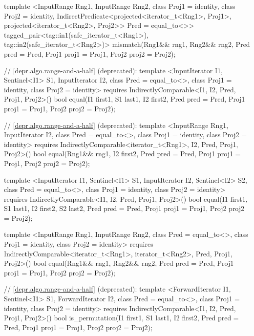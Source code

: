 \begin{codeblock}
{{{{  template <InputRange Rng1, InputRange Rng2,
      class Proj1 = identity, class Proj2 = identity,
      IndirectPredicate<projected<iterator_t<Rng1>, Proj1>,
        projected<iterator_t<Rng2>, Proj2>> Pred = equal_to<>>
    tagged_pair<tag::in1(safe_iterator_t<Rng1>),
                tag::in2(safe_iterator_t<Rng2>)>
      mismatch(Rng1&& rng1, Rng2&& rng2, Pred pred = Pred{},
               Proj1 proj1 = Proj1{}, Proj2 proj2 = Proj2{});

  // \ref{depr.algo.range-and-a-half} (deprecated):
  template <InputIterator I1, Sentinel<I1> S1, InputIterator I2,
      class Pred = equal_to<>, class Proj1 = identity, class Proj2 = identity>
    requires IndirectlyComparable<I1, I2, Pred, Proj1, Proj2>()
    bool equal(I1 first1, S1 last1,
               I2 first2, Pred pred = Pred{},
               Proj1 proj1 = Proj1{}, Proj2 proj2 = Proj2{});

  // \ref{depr.algo.range-and-a-half} (deprecated):
  template <InputRange Rng1, InputIterator I2, class Pred = equal_to<>,
      class Proj1 = identity, class Proj2 = identity>
    requires IndirectlyComparable<iterator_t<Rng1>, I2, Pred, Proj1, Proj2>()
    bool equal(Rng1&& rng1, I2 first2, Pred pred = Pred{},
               Proj1 proj1 = Proj1{}, Proj2 proj2 = Proj2{});

  template <InputIterator I1, Sentinel<I1> S1, InputIterator I2, Sentinel<I2> S2,
      class Pred = equal_to<>, class Proj1 = identity, class Proj2 = identity>
    requires IndirectlyComparable<I1, I2, Pred, Proj1, Proj2>()
    bool equal(I1 first1, S1 last1, I2 first2, S2 last2,
               Pred pred = Pred{},
               Proj1 proj1 = Proj1{}, Proj2 proj2 = Proj2{});

  template <InputRange Rng1, InputRange Rng2, class Pred = equal_to<>,
      class Proj1 = identity, class Proj2 = identity>
    requires IndirectlyComparable<iterator_t<Rng1>, iterator_t<Rng2>, Pred, Proj1, Proj2>()
    bool equal(Rng1&& rng1, Rng2&& rng2, Pred pred = Pred{},
               Proj1 proj1 = Proj1{}, Proj2 proj2 = Proj2{});

  // \ref{depr.algo.range-and-a-half} (deprecated):
  template <ForwardIterator I1, Sentinel<I1> S1, ForwardIterator I2,
      class Pred = equal_to<>, class Proj1 = identity, class Proj2 = identity>
    requires IndirectlyComparable<I1, I2, Pred, Proj1, Proj2>()
    bool is_permutation(I1 first1, S1 last1, I2 first2,
                        Pred pred = Pred{},
                        Proj1 proj1 = Proj1{}, Proj2 proj2 = Proj2{});

}}}}
\end{codeblock}
